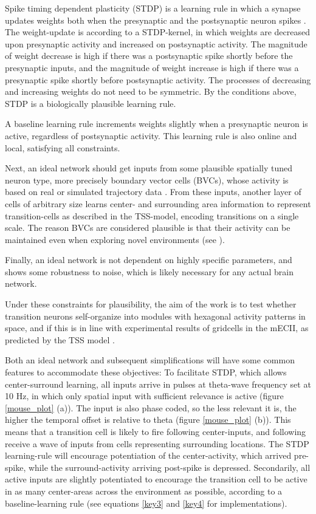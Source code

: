 \documentclass{article}
\begin{document}
    Spike timing dependent plasticity (STDP) is a learning rule in which a synapse updates weights both when the presynaptic and the postsynaptic neuron spikes \parencite{Song2000}. The weight-update is according to a STDP-kernel, in which weights are decreased upon presynaptic activity and increased on postsynaptic activity. The magnitude of weight decrease is high if there was a postsynaptic spike shortly before the presynaptic inputs, and the magnitude of weight increase is high if there was a presynaptic spike shortly before postsynaptic activity. The processes of decreasing and increasing weights do not need to be symmetric. By the conditions above, STDP is a biologically plausible learning rule.

    A baseline learning rule increments weights slightly when a presynaptic neuron is active, regardless of postsynaptic activity. This learning rule is also online and local, satisfying all constraints.
    
    Next, an ideal network should get inputs from some plausible spatially tuned neuron type, more precisely boundary vector cells (BVCs), whose activity is based on real or simulated trajectory data \parencite{Lever2009}. From these inputs, another layer of cells of arbitrary size learns center- and surrounding area information to represent transition-cells as described in the TSS-model, encoding transitions on a single scale. The reason BVCs are considered plausible is that their activity can be maintained even when exploring novel environments (see \cite{Raudies2012}).
    
    Finally, an ideal network is not dependent on highly specific parameters, and shows some robustness to noise, which is likely necessary for any actual brain network.

    Under these constraints for plausibility, the aim of the work is to test whether transition neurons self-organize into modules with hexagonal activity patterns in space, and if this is in line with experimental results of gridcells in the mECII, as predicted by the TSS model \parencite{Waniek2018}.

    Both an ideal network and subsequent simplifications will have some common features to accommodate these objectives: To facilitate STDP, which allows center-surround learning, all inputs arrive in pulses at theta-wave frequency set at 10 Hz, in which only spatial input with sufficient relevance is active (figure \ref{mouse_plot} (a)). The input is also phase coded, so the less relevant it is, the higher the temporal offset is relative to theta (figure \ref{mouse_plot} (b)). This means that a transition cell is likely to fire following center-inputs, and following receive a wave of inputs from cells representing surrounding locations. The STDP learning-rule will encourage potentiation of the center-activity, which arrived pre-spike, while the surround-activity arriving post-spike is depressed. Secondarily, all active inputs are slightly potentiated to encourage the transition cell to be active in as many center-areas across the environment as possible, according to a baseline-learning rule (see equations \ref{key3} and \ref{key4} for implementations).
\end{document}
